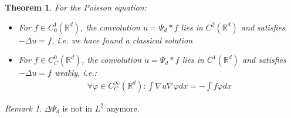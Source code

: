 \documentclass[a4paper,11pt,oneside,fleqn]{book}
\newtheorem{theorem}{Theorem}[section]
\theoremstyle{definition}
\theoremstyle{remark}
\newtheorem*{remark}{Remark}
\begin{document}
\begin{theorem}
For the Poisson equation:
\begin{itemize}
	\item For $f \in C_0^1(\mathbb{R}^d)$, the convolution $u = \Psi_d * f$ lies in $C^2(\mathbb{R}^d)$ and satisfies $-\Delta u = f$, i.e. we have found a classical solution
	\item For $f \in C_C^0(\mathbb{R}^d)$, the convolution $u = \Psi_d * f$ lies in $C^1(\mathbb{R}^d)$ and satisfies $-\Delta u= f$ weakly, i.e.:
	\begin{align*}
		\forall \varphi \in C^\infty_C(\mathbb{R}^d): \int \nabla u \nabla \varphi dx = -\int f \varphi dx
	\end{align*}
\end{itemize}
\end{theorem}
\begin{remark}
$\Delta \Psi_d$ is not in $L^2$ anymore.	
\end{remark}
\end{document}
